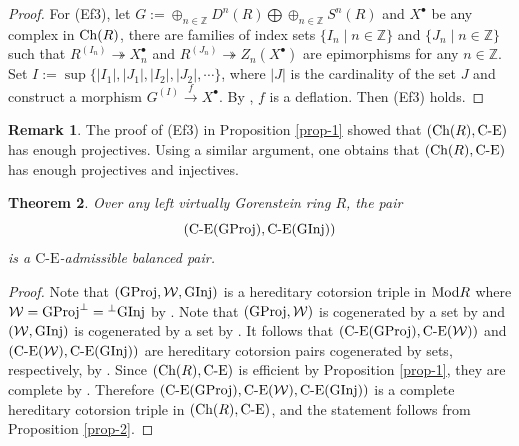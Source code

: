 \documentclass[reqno,12pt]{amsart}
\numberwithin{equation}{section}
\def\Ch{\mbox{\rm Ch}}
\theoremstyle{plain}
\newtheorem{theorem}{\bf Theorem}[section]
\theoremstyle{definition}
\newtheorem{remark}[theorem]{\bf Remark}
\newcommand{\CE}{\mathrm{C}\text{-}\mathrm{E}}
\begin{document}
\begin{proof}
    For {\rm (Ef3)}, let
    $G:=\oplus_{n\in\mathbb{Z}} D^n(R)\bigoplus \oplus_{n\in\mathbb{Z}}S^n(R)$ and
    $X^{\bullet}$ be any complex in $\Ch(R)$, there are families of index sets
    $\{I_n\mid n\in\mathbb{Z}\}$ and $\{J_n\mid n\in\mathbb{Z}\}$ such that
    $R^{(I_n)}\twoheadrightarrow X^{\bullet}_n$ and
    $R^{(J_n)}\twoheadrightarrow Z_n(X^{\bullet})$ are epimorphisms for any
    $n\in\mathbb{Z}$. Set $I:=\sup\{|I_1|,|J_1|,|I_2|,|J_2|,\cdots\}$, where
    $|J|$ is the cardinality of the set $J$ and construct a morphism $G^{(I)}\stackrel{f}\to X^{\bullet}$. By \cite[Proposition 9.1.4]{EJ11-2}, $f$ is a deflation.  Then {\rm (Ef3)} holds.
\end{proof}

\begin{remark}\label{rmk-4}
    The proof of (Ef3) in Proposition \ref{prop-1} showed that $(\Ch(R),\text{C-E})$ has enough projectives. Using a similar argument, one obtains that $(\Ch(R),\text{C-E})$ has enough projectives and injectives.
\end{remark}

\begin{theorem}\label{thm-1}
    Over any left virtually Gorenstein ring $R$, the pair
    $$(\CE({\rm GProj}),\CE({\rm GInj}))$$ is a $\CE$-admissible balanced pair.
\end{theorem}
\begin{proof}
    Note that $({\rm GProj},\mathcal{W},{\rm GInj})$ is a hereditary cotorsion triple in
    $\mbox{\rm Mod} R$ where $\mathcal{W}={\rm GProj}^{\bot}={^{\bot}{\rm GInj}}$ by
    \cite[Proposition 3.16]{WE25}. Note that $({\rm GProj},\mathcal{W})$ is cogenerated by a
    set by \cite[Theorem 4.9 and Example 4.10]{SS20} and $(\mathcal{W},{\rm GInj})$ is
    cogenerated by a set by \cite[Theorem 5.6]{SS20}. It follows that
    $(\text{C-E}({\rm GProj}),\text{C-E}(\mathcal{W}))$ and $(\text{C-E}(\mathcal{W}),\text{C-E}({\rm GInj}))$ are hereditary cotorsion pairs cogenerated by sets, respectively, by
    \cite[Theorem 9.4]{E11}.
    Since $(\Ch(R),\text{C-E})$ is efficient by Proposition \ref{prop-1},
    they are complete by \cite[Proposition 5.8]{S13}. Therefore
    $(\text{C-E}({\rm GProj}),\text{C-E}(\mathcal{W}),\text{C-E}({\rm GInj}))$ is a
    complete hereditary cotorsion triple in $(\Ch (R), \text{C-E})$, and the statement
    follows from Proposition \ref{prop-2}.
\end{proof}
\end{document}
